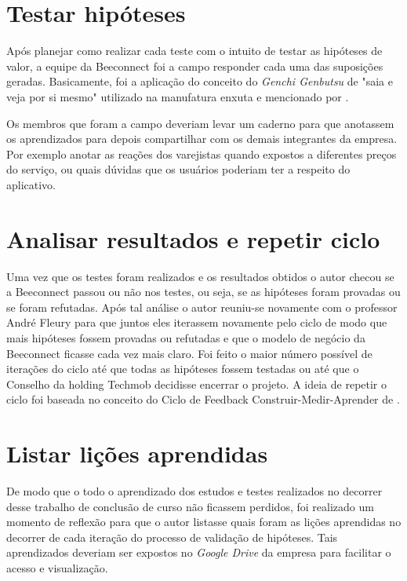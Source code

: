 \section{Testar hipóteses}
\label{cha:testar_hipoteses}
Após planejar como realizar cada teste com o intuito de testar as hipóteses de valor, a equipe da Beeconnect foi a campo responder cada uma das suposições geradas. Basicamente, foi a aplicação do conceito do \textit{Genchi Genbutsu} de "saia e veja por si mesmo" utilizado na manufatura enxuta e mencionado por .

Os membros que foram a campo deveriam levar um caderno para que anotassem os aprendizados para depois compartilhar com os demais integrantes da empresa. Por exemplo anotar as reações dos varejistas quando expostos a diferentes preços do serviço, ou quais dúvidas que os usuários poderiam ter a respeito do aplicativo.

\section{Analisar resultados e repetir ciclo}
\label{cha:analisar_resultados}
Uma vez que os testes foram realizados e os resultados obtidos o autor checou se a Beeconnect passou ou não nos testes, ou seja, se as hipóteses foram provadas ou se foram refutadas. 
Após tal análise o autor reuniu-se novamente com o professor André Fleury para que juntos eles iterassem novamente pelo ciclo de modo que mais hipóteses fossem provadas ou refutadas e que o modelo de negócio da Beeconnect ficasse cada vez mais claro. Foi feito o maior número possível de iterações do ciclo até que todas as hipóteses fossem testadas ou até que o Conselho da holding Techmob decidisse encerrar o projeto. A ideia de repetir o ciclo foi baseada no conceito do Ciclo de Feedback Construir-Medir-Aprender de .

\section{Listar lições aprendidas}
\label{cha:listar_licoes_aprendidas}
De modo que o todo o aprendizado dos estudos e testes realizados no decorrer desse trabalho de conclusão de curso não ficassem perdidos, foi realizado um momento de reflexão para que o autor listasse quais foram as lições aprendidas no decorrer de cada iteração do processo de validação de hipóteses. Tais aprendizados deveriam ser expostos no \textit{Google Drive} da empresa para facilitar o acesso e visualização.